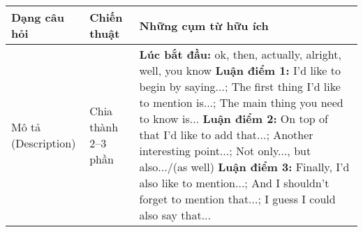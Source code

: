 \begin{tabularx}{\textwidth}{|>{\raggedright\arraybackslash}p{}|
                                 >{\raggedright\arraybackslash}p{}|
                                 >{\raggedright\arraybackslash}X|}
\hline
\textbf{Dạng câu hỏi} & \textbf{Chiến thuật} & \textbf{Những cụm từ hữu ích} \\
\hline

Mô tả (Description) & 
Chia thành 2--3 phần &
\textbf{Lúc bắt đầu:} ok, then, actually, alright, well, you know \newline
\textbf{Luận điểm 1:} I'd like to begin by saying...; The first thing I'd like to mention is...; The main thing you need to know is... \newline
\textbf{Luận điểm 2:} On top of that I'd like to add that...; Another interesting point...; Not only..., but also.../(as well) \newline
\textbf{Luận điểm 3:} Finally, I'd also like to mention...; And I shouldn't forget to mention that...; I guess I could also say that... \\
\hline
\end{tabularx}

\vspace{1cm}

